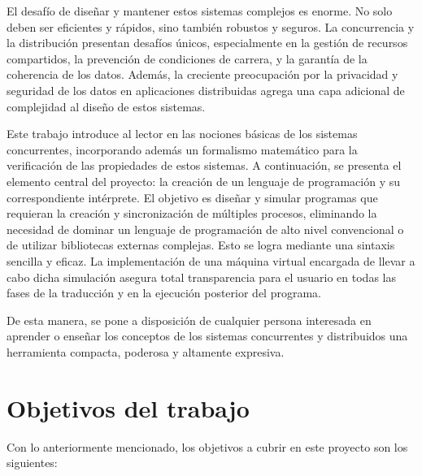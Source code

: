 El desafío de diseñar y mantener estos sistemas complejos es enorme. No solo deben ser eficientes y rápidos, sino también robustos y seguros. La concurrencia y la distribución presentan desafíos únicos, especialmente en la gestión de recursos compartidos, la prevención de condiciones de carrera, y la garantía de la coherencia de los datos. Además, la creciente preocupación por la privacidad y seguridad de los datos en aplicaciones distribuidas agrega una capa adicional de complejidad al diseño de estos sistemas.

Este trabajo introduce al lector en las nociones básicas de los sistemas concurrentes, incorporando además un formalismo matemático para la verificación de las propiedades de estos sistemas. A continuación, se presenta el elemento central del proyecto: la creación de un lenguaje de programación y su correspondiente intérprete. El objetivo es diseñar y simular programas que requieran la creación y sincronización de múltiples procesos, eliminando la necesidad de dominar un lenguaje de programación de alto nivel convencional o de utilizar bibliotecas externas complejas. Esto se logra mediante una sintaxis sencilla y eficaz. La implementación de una máquina virtual encargada de llevar a cabo dicha simulación asegura total transparencia para el usuario en todas las fases de la traducción y en la ejecución posterior del programa.

De esta manera, se pone a disposición de cualquier persona interesada en aprender o enseñar los conceptos de los sistemas concurrentes y distribuidos una herramienta compacta, poderosa y altamente expresiva.

\section{Objetivos del trabajo}
Con lo anteriormente mencionado, los objetivos a cubrir en este proyecto son los siguientes:


